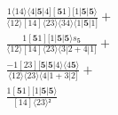\documentclass[varwidth, border=5pt]{standalone}
\begin{document}
\begin{my}
$\begin{gathered}
\scriptscriptstyle\frac{1⟨14⟩⟨4|𝟓|4][𝟓1][1|𝟓|𝟓⟩}{⟨12⟩[14]⟨23⟩⟨34⟩⟨1|𝟓|1]} +\\
\scriptscriptstyle\frac{1[𝟓1][1|𝟓|𝟓⟩s_{𝟓}}{⟨12⟩[14]⟨23⟩⟨3|2+4|1]} +\\
\scriptscriptstyle\frac{-1[23][𝟓|𝟓|4⟩⟨4𝟓⟩}{⟨12⟩⟨23⟩⟨4|1+3|2]} +\\
\scriptscriptstyle\frac{1[𝟓1][1|𝟓|𝟓⟩}{[14]⟨23⟩²} \phantom{+}
\end{gathered}$
\end{my}
\end{document}
